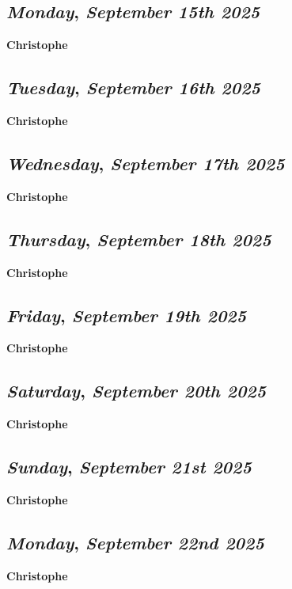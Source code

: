 \def\day{\textit{September 15th 2025}}
\def\weekday{\textit{Monday}}
\subsection*{\weekday, \day}
\textbf {Christophe}

\def\day{\textit{September 16th 2025}}
\def\weekday{\textit{Tuesday}}
\subsection*{\weekday, \day}
\textbf {Christophe}

\def\day{\textit{September 17th 2025}}
\def\weekday{\textit{Wednesday}}
\subsection*{\weekday, \day}
\textbf {Christophe}

\def\day{\textit{September 18th 2025}}
\def\weekday{\textit{Thursday}}
\subsection*{\weekday, \day}
\textbf {Christophe}

\def\day{\textit{September 19th 2025}}
\def\weekday{\textit{Friday}}
\subsection*{\weekday, \day}
\textbf {Christophe}

\def\day{\textit{September 20th 2025}}
\def\weekday{\textit{Saturday}}
\subsection*{\weekday, \day}
\textbf {Christophe}

\def\day{\textit{September 21st 2025}}
\def\weekday{\textit{Sunday}}
\subsection*{\weekday, \day}
\textbf {Christophe}

\def\day{\textit{September 22nd 2025}}
\def\weekday{\textit{Monday}}
\subsection*{\weekday, \day}
\textbf {Christophe}

\def\day{\textit{September 23rd 2025}}
\def\weekday{\textit{Tuesday}}
